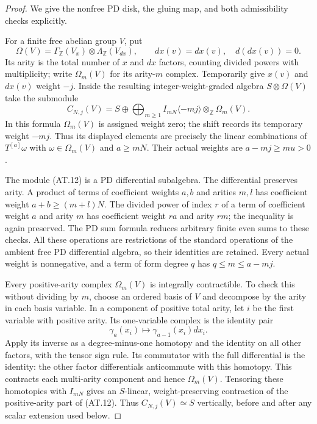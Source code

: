 \begin{proof}
We give the nonfree PD disk, the gluing map, and both
admissibility checks explicitly.

For a finite free abelian group $V$, put
\[
 \Omega(V)=\Gamma_{\mathbb Z}(V_x)
             \otimes\Lambda_{\mathbb Z}(V_{dx}),
 \qquad d x(v)=dx(v),\quad d(dx(v))=0.
\]
Its arity is the total number of $x$ and $dx$ factors,
counting divided powers with multiplicity; write
$\Omega_m(V)$ for its arity-$m$ complex.
Temporarily give $x(v)$ and $dx(v)$ weight $-j$.
Inside the resulting integer-weight-graded algebra
$S\otimes\Omega(V)$ take the submodule
\[
 C_{N,j}(V)=S\oplus
 \bigoplus_{m\geq1} I_{mN}\langle-mj\rangle
                      \otimes_{\mathbb Z}\Omega_m(V).
 \tag{AT.12}
\]
In this formula $\Omega_m(V)$ is assigned weight zero;
the shift records its temporary weight $-mj$.
Thus its displayed elements are precisely the linear
combinations of $T^{[a]}\omega$ with
$\omega\in\Omega_m(V)$ and $a\geq mN$.
Their actual weights are $a-mj\geq mu>0$.

The module (AT.12) is a PD differential subalgebra.
The differential preserves arity. A product of terms
of coefficient weights $a,b$ and arities $m,l$
has coefficient weight $a+b\geq(m+l)N$.
The divided power of index $r$ of a term of coefficient
weight $a$ and arity $m$ has coefficient weight $ra$
and arity $rm$; the inequality is again preserved.
The PD sum formula reduces arbitrary finite even sums
to these checks. All these operations are restrictions
of the standard operations of the ambient free PD
differential algebra, so their identities are retained.
Every actual weight is nonnegative, and a term of
form degree $q$ has $q\leq m\leq a-mj$.

Every positive-arity complex $\Omega_m(V)$ is
integrally contractible. To check this without dividing
by $m$, choose an ordered basis of $V$ and decompose
by the arity in each basis variable. In a component
of positive total arity, let $i$ be the first variable
with positive arity. Its one-variable complex is the
identity pair
\[
 \gamma_a(x_i)\longmapsto\gamma_{a-1}(x_i)dx_i.
\]
Apply its inverse as a degree-minus-one homotopy and
the identity on all other factors, with the tensor
sign rule. Its commutator with the full differential
is the identity: the other factor differentials
anticommute with this homotopy. This contracts each
multi-arity component and hence $\Omega_m(V)$.
Tensoring these homotopies with $I_{mN}$ gives an
$S$-linear, weight-preserving contraction of the
positive-arity part of (AT.12). Thus
$C_{N,j}(V)\simeq S$ vertically, before and after
any scalar extension used below.


\end{proof}
